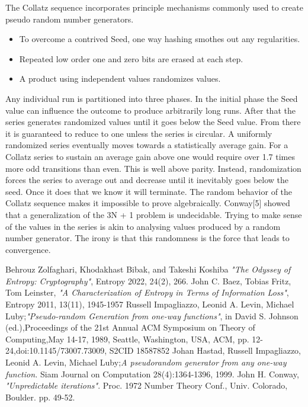 \documentclass[preprint,natbib]{sigplanconf}
\begin{document}
The Collatz sequence incorporates principle mechanisms commonly used to create pseudo random number generators.

\begin{itemize}
    \item To overcome a contrived Seed, one way hashing smothes out any regularities.
    \item Repeated low order one and zero bits are erased at each step.
    \item A product using independent values randomizes values.
\end{itemize}
Any individual run is partitioned into three phases. In the initial phase the Seed value can influence the outcome to produce arbitrarily long runs. After that the series generates randomized values until it goes below the Seed value. From there it is guaranteed to reduce to one unless the series is circular.
A uniformly randomized series eventually moves towards a statistically average gain. For a Collatz series to sustain an average gain above one would require over 1.7 times more odd transitions than even. This is well above parity. Instead, randomization forces the series to average out and decrease until it inevitably goes below the seed. Once it does that we know it will terminate.
The random behavior of the Collatz sequence makes it impossible to prove algebraically. Conway[5] showed that a generalization of the 3N + 1 problem is undecidable. Trying to make sense of the values in the series is akin to analysing values produced by a random number generator. The irony is that this randomness is the force that leads to convergence.

\begin{thebibliography}{9}
    Behrouz Zolfaghari, Khodakhast Bibak, and Takeshi Koshiba \emph{"The Odyssey of Entropy: Cryptography"}, Entropy 2022, 24(2), 266.%
    John C. Baez, Tobias Fritz, Tom Leinster, \emph{"A Characterization of Entropy in Terms of Information Loss"}, Entropy 2011, 13(11), 1945-1957%
    Russell Impagliazzo, Leonid A. Levin, Michael Luby;\emph{"Pseudo-random Generation from one-way functions"}, in David S. Johnson (ed.),Proceedings of the 21st Annual ACM Symposium on Theory of Computing,May 14-17, 1989, Seattle, Washington, USA, {ACM}, pp. 12-24,doi:10.1145/73007.73009, S2CID 18587852%
    Johan Hastad, Russell Impagliazzo, Leonid A. Levin, Michael Luby;\emph{A pseudorandom generator from any one-way function.} Siam Journal on Computation 28(4):1364-1396, 1999.%
    John H. Conway, \emph{"Unpredictable iterations"}. Proc. 1972 Number Theory Conf., Univ. Colorado, Boulder. pp. 49-52.
\end{thebibliography}
\end{document}
